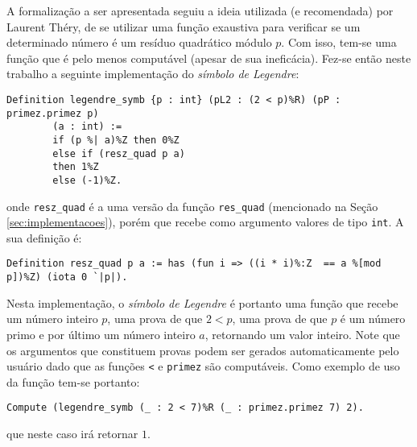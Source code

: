 A formalização a ser apresentada seguiu a ideia utilizada (e recomendada) por Laurent Théry, de se utilizar uma função exaustiva para verificar se um determinado número é um resíduo quadrático módulo $p$. Com isso, tem-se uma função que é pelo menos computável (apesar de sua ineficácia). Fez-se então neste trabalho a seguinte implementação do \textit{símbolo de Legendre}:
        \begin{lstlisting}[language=coq,frame=single,tabsize=1]
Definition legendre_symb {p : int} (pL2 : (2 < p)%R) (pP : primez.primez p) 
        (a : int) :=
        if (p %| a)%Z then 0%Z
        else if (resz_quad p a)
        then 1%Z
        else (-1)%Z.
        \end{lstlisting}
onde \lstinline[language=coq]|resz_quad| é a uma versão da função \lstinline[language=coq]|res_quad| (mencionado na Seção \ref{sec:implementacoes}), porém que recebe como argumento valores de tipo \lstinline[language=coq]|int|. A sua definição é:
        \begin{lstlisting}[language=coq,frame=single,tabsize=1]
Definition resz_quad p a := has (fun i => ((i * i)%:Z  == a %[mod p])%Z) (iota 0 `|p|).
        \end{lstlisting}
Nesta implementação, o \textit{símbolo de Legendre} é portanto uma função que recebe um número inteiro $p$, uma prova de que $2 < p$, uma prova de que $p$ é um número primo e por último um número inteiro $a$, retornando um valor inteiro. Note que os argumentos que constituem provas podem ser gerados automaticamente pelo usuário dado que as funções \lstinline[language=coq]!<! e \lstinline[language=coq]!primez! são computáveis. Como exemplo de uso da função tem-se portanto:
        \begin{lstlisting}[language=coq,frame=single,tabsize=1]
Compute (legendre_symb (_ : 2 < 7)%R (_ : primez.primez 7) 2).
        \end{lstlisting}
que neste caso irá retornar $1$.

